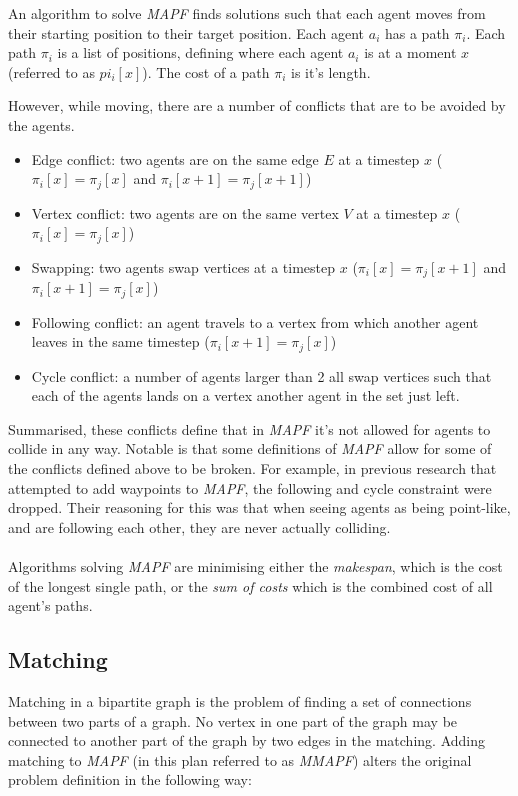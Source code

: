 \documentclass[english]{article}
\begin{document}
An algorithm to solve \textit{MAPF} finds solutions such that each agent moves from their starting position
to their target position. Each agent $a_i$ has a path $\pi_i$. Each path $\pi_i$ is a list of positions, defining where each agent $a_i$ is at a moment $x$ (referred to as $pi_i[x]$). The cost of a path $\pi_i$ is it's length.

However, while moving, there are a number of conflicts that are to be avoided by the agents.

\begin{itemize}
    \item Edge conflict: two agents are on the same edge $E$ at a timestep $x$ ($\pi_i[x] = \pi_j[x]$ and $\pi_i[x+1] = \pi_j[x+1]$)
    \item Vertex conflict: two agents are on the same vertex $V$ at a timestep $x$ ($\pi_i[x] = \pi_j[x]$)
    \item Swapping: two agents swap vertices at a timestep $x$ ($\pi_i[x] = \pi_j[x+1]$ and $\pi_i[x+1] = \pi_j[x]$)
    \item Following conflict: an agent travels to a vertex from which another agent leaves in the same timestep ($\pi_i[x+1] = \pi_j[x]$)
    \item Cycle conflict: a number of agents larger than 2 all swap vertices such that each of the agents lands on a vertex another agent in the set just left.
\end{itemize}

Summarised, these conflicts define that in \textit{MAPF} it's not allowed for agents to collide in any way. Notable is that some definitions of \textit{MAPF} allow for some of the conflicts defined above to be broken. For example, in previous research that attempted to add waypoints to \textit{MAPF}, the following and cycle constraint were dropped. Their reasoning for this was that when seeing agents as being point-like, and are following each other, they are never actually colliding.

\paragraph{}

Algorithms solving \textit{MAPF} are minimising either the \textit{makespan}, which is the cost of the longest single path, or the \textit{sum of costs} which is the combined cost of all agent's paths.

\subsection{Matching}
Matching in a bipartite graph is the problem of finding a set of connections between two parts of a graph. No vertex in one part of the graph may be connected to another part of the graph by two edges in the matching. Adding matching to \textit{MAPF} (in this plan referred to as \textit{MMAPF}) alters the original problem definition in the following way:
\end{document}
